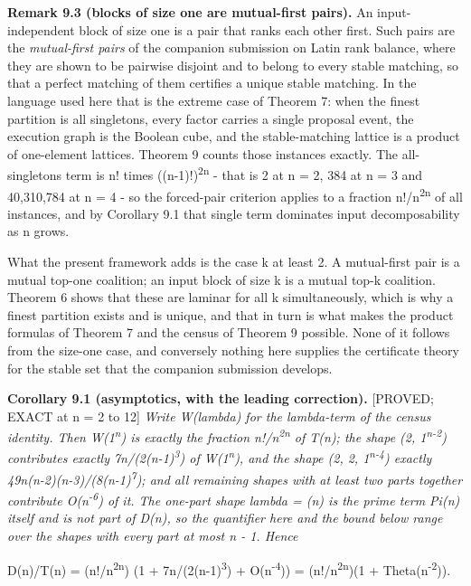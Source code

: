 \documentclass[
  11pt,
]{article}
\begin{document}
\textbf{Remark 9.3 (blocks of size one are mutual-first pairs).} An
input-independent block of size one is a pair that ranks each other
first. Such pairs are the \emph{mutual-first pairs} of the companion
submission on Latin rank balance, where they are shown to be pairwise
disjoint and to belong to every stable matching, so that a perfect
matching of them certifies a unique stable matching. In the language
used here that is the extreme case of Theorem 7: when the finest
partition is all singletons, every factor carries a single proposal
event, the execution graph is the Boolean cube, and the stable-matching
lattice is a product of one-element lattices. Theorem 9 counts those
instances exactly. The all-singletons term is n! times
((n-1)!)\textsuperscript{2n} - that is 2 at n = 2, 384 at n = 3 and
40,310,784 at n = 4 - so the forced-pair criterion applies to a fraction
n!/n\textsuperscript{2n} of all instances, and by Corollary 9.1 that
single term dominates input decomposability as n grows.

What the present framework adds is the case k at least 2. A mutual-first
pair is a mutual top-one coalition; an input block of size k is a mutual
top-k coalition. Theorem 6 shows that these are laminar for all k
simultaneously, which is why a finest partition exists and is unique,
and that in turn is what makes the product formulas of Theorem 7 and the
census of Theorem 9 possible. None of it follows from the size-one case,
and conversely nothing here supplies the certificate theory for the
stable set that the companion submission develops.

\textbf{Corollary 9.1 (asymptotics, with the leading correction).}
{[}PROVED; EXACT at n = 2 to 12{]} \emph{Write W(lambda) for the
lambda-term of the census identity. Then W(1\textsuperscript{n}) is
exactly the fraction n!/n\textsuperscript{2n} of T(n); the shape (2,
1\textsuperscript{n-2}) contributes exactly
7n/(2(n-1)\textsuperscript{3}) of W(1\textsuperscript{n}), and the shape
(2, 2, 1\textsuperscript{n-4}) exactly
49n(n-2)(n-3)/(8(n-1)\textsuperscript{7}); and all remaining shapes with
at least two parts together contribute O(n\textsuperscript{-6}) of it.
The one-part shape lambda = (n) is the prime term Pi(n) itself and is
not part of D(n), so the quantifier here and the bound below range over
the shapes with every part at most n - 1. Hence}

D(n)/T(n) = (n!/n\textsuperscript{2n}) (1 +
7n/(2(n-1)\textsuperscript{3}) + O(n\textsuperscript{-4})) =
(n!/n\textsuperscript{2n})(1 + Theta(n\textsuperscript{-2})).
\end{document}
